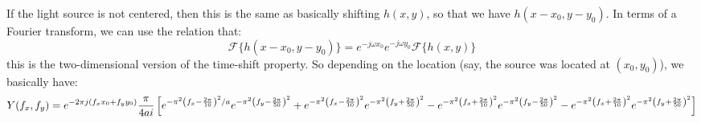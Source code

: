 \documentclass[10pt]{article}
\begin{document}
\begin{enumerate}[label=\alph*)]
			\begin{solution}
				If the light source is not centered, then this is the same as basically shifting 
				\( h(x, y) \), so that we have \( h(x - x_0, y - y_0) \). In terms of a Fourier transform, we can use 
				the relation that:
				\[
				\mathcal F \{h(x - x_0, y - y_0)\}  = e^{-j \omega x_0}e^{-j \omega y_0} \mathcal F \{h(x, y)\} 
				\] 
				this is the two-dimensional version of the time-shift property. So depending on the location (say, 
				the source was located at \( (x_0, y_0) \)), we 
				basically have:
				\begin{dmath*}
					Y(f_x, f_y) = e^{-2 \pi j (f_x x_0 + f_y y_0)}\frac{\pi}{4ai}
					\left[ e^{-\pi^2 \left( f_x - \frac{2\pi}{10} \right)^2 / a} 
					e^{-\pi^2 \left( f_y - \frac{2\pi}{50} \right)^2} 
					+ e^{-\pi^2 \left( f_x - \frac{2\pi}{10} \right)^2}
					e^{-\pi^2\left( f_y + \frac{2\pi}{50} \right)^2}\\
					- e^{-\pi^2\left( f_x + \frac{2\pi}{10} \right)^2} 
					e^{-\pi^2\left( f_y - \frac{2\pi}{50} \right)^2}
					- e^{-\pi^2\left( f_x + \frac{2\pi}{10} \right)^2}
					e^{-\pi^2 \left( f_y + \frac{2\pi}{50} \right)^2}
				\right] 
				\end{dmath*}

			\end{solution}
	\end{enumerate}
\end{document}
